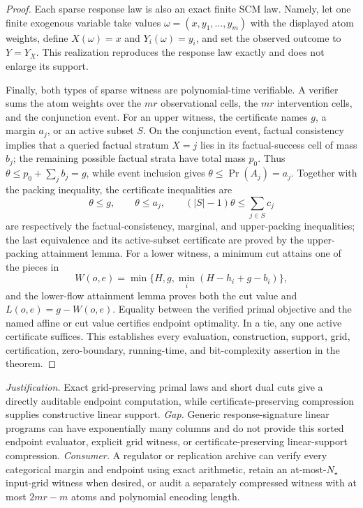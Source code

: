 \documentclass{article}
\begin{document}
\begin{proof}
Each sparse response law is also an exact finite SCM law.  Namely, let one finite exogenous variable take values \(\omega=(x,y_1,\ldots,y_m)\) with the displayed atom weights, define \(X(\omega)=x\) and \(Y_i(\omega)=y_i\), and set the observed outcome to \(Y=Y_X\).  This realization reproduces the response law exactly and does not enlarge its support.

Finally, both types of sparse witness are polynomial-time verifiable.  A verifier sums the atom weights over the \(mr\) observational cells, the \(mr\) intervention cells, and the conjunction event.  For an upper witness, the certificate names \(g\), a margin \(a_j\), or an active subset \(S\).  On the conjunction event, factual consistency implies that a queried factual stratum \(X=j\) lies in its factual-success cell of mass \(b_j\); the remaining possible factual strata have total mass \(p_0\).  Thus \(\theta\leq p_0+\sum_jb_j=g\), while event inclusion gives \(\theta\leq\Pr(A_j)=a_j\).  Together with the packing inequality, the certificate inequalities are
\[
\theta\leq g,
\qquad
\theta\leq a_j,
\qquad
(|S|-1)\theta\leq\sum_{j\in S}c_j
\]
are respectively the factual-consistency, marginal, and upper-packing inequalities; the last equivalence and its active-subset certificate are proved by the upper-packing attainment lemma.  For a lower witness, a minimum cut attains one of the pieces in
\[
W(o,e)=\min\{H,g,\min_i(H-h_i+g-b_i)\},
\]
and the lower-flow attainment lemma proves both the cut value and \(L(o,e)=g-W(o,e)\).  Equality between the verified primal objective and the named affine or cut value certifies endpoint optimality.  In a tie, any one active certificate suffices.  This establishes every evaluation, construction, support, grid, certification, zero-boundary, running-time, and bit-complexity assertion in the theorem.
\end{proof}
\par\smallskip\noindent \textit{Justification.} Exact grid-preserving primal laws and short dual cuts give a directly auditable endpoint computation, while certificate-preserving compression supplies constructive linear support. \textit{Gap.} Generic response-signature linear programs can have exponentially many columns and do not provide this sorted endpoint evaluator, explicit grid witness, or certificate-preserving linear-support compression. \textit{Consumer.} A regulator or replication archive can verify every categorical margin and endpoint using exact arithmetic, retain an at-most-\(N_\star\) input-grid witness when desired, or audit a separately compressed witness with at most \(2mr-m\) atoms and polynomial encoding length.
\end{document}
